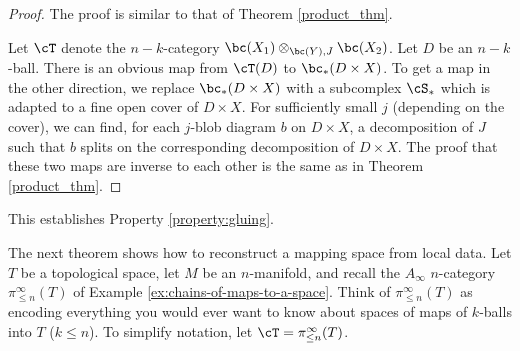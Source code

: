 \begin{proof}
The proof is similar to that of Theorem \ref{product_thm}.

Let $\cT$ denote the $n{-}k$-category $\bc(X_1) \otimes_{\bc(Y), J} \bc(X_2)$.
Let $D$ be an $n{-}k$-ball.
There is an obvious map from $\cT(D)$ to $\bc_*(D\times X)$.
To get a map in the other direction, we replace $\bc_*(D\times X)$ with a subcomplex
$\cS_*$ which is adapted to a fine open cover of $D\times X$.
For sufficiently small $j$ (depending on the cover), we can find, for each $j$-blob diagram $b$
on $D\times X$, a decomposition of $J$ such that $b$ splits on the corresponding
decomposition of $D\times X$.
The proof that these two maps are inverse to each other is the same as in
Theorem \ref{product_thm}.
\end{proof}

This establishes Property \ref{property:gluing}.

\medskip

The next theorem shows how to reconstruct a mapping space from local data.
Let $T$ be a topological space, let $M$ be an $n$-manifold, 
and recall the $A_\infty$ $n$-category $\pi^\infty_{\leq n}(T)$ 
of Example \ref{ex:chains-of-maps-to-a-space}.
Think of $\pi^\infty_{\leq n}(T)$ as encoding everything you would ever
want to know about spaces of maps of $k$-balls into $T$ ($k\le n$).
To simplify notation, let $\cT = \pi^\infty_{\leq n}(T)$.

